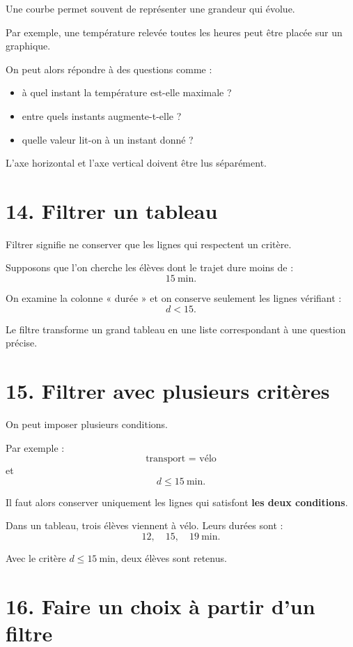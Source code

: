 Une courbe permet souvent de représenter une grandeur qui évolue.

Par exemple, une température relevée toutes les heures peut être placée sur un graphique.

On peut alors répondre à des questions comme :
\begin{itemize}
\item à quel instant la température est-elle maximale ?
\item entre quels instants augmente-t-elle ?
\item quelle valeur lit-on à un instant donné ?
\end{itemize}

L'axe horizontal et l'axe vertical doivent être lus séparément.

\section{14. Filtrer un tableau}

Filtrer signifie ne conserver que les lignes qui respectent un critère.

Supposons que l'on cherche les élèves dont le trajet dure moins de :
\[
15\ \text{min}.
\]

On examine la colonne « durée » et on conserve seulement les lignes vérifiant :
\[
d<15.
\]

Le filtre transforme un grand tableau en une liste correspondant à une question précise.

\section{15. Filtrer avec plusieurs critères}

On peut imposer plusieurs conditions.

Par exemple :
\[
\text{transport = vélo}
\]
et
\[
d\le15\ \text{min}.
\]

Il faut alors conserver uniquement les lignes qui satisfont \textbf{les deux conditions}.

\begin{exemple}
Dans un tableau, trois élèves viennent à vélo. Leurs durées sont :
\[
12,\quad15,\quad19\ \text{min}.
\]

Avec le critère $d\le15\ \text{min}$, deux élèves sont retenus.
\end{exemple}

\section{16. Faire un choix à partir d'un filtre}

